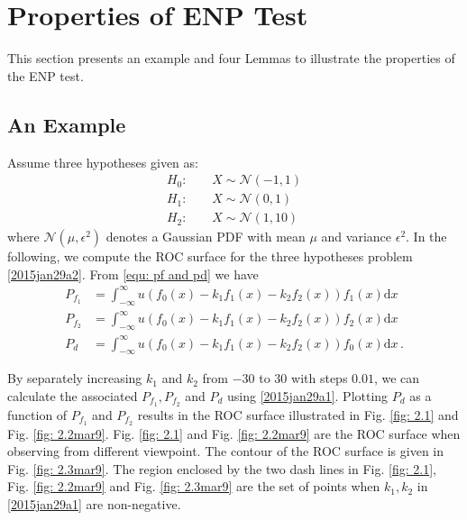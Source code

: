 
\section{Properties of ENP Test}
This section presents an example and four Lemmas to illustrate the properties of the ENP test. 
\subsection{An Example}
Assume three hypotheses given as:
\begin{equation}
  \label{2015jan29a2}
\begin{split}
H_0:\;\;\;\;&X \sim \mathcal{N}(-1, 1)\\
H_1:\;\;\;\;&X \sim \mathcal{N}(0, 1)\\
H_2:\;\;\;\;&X \sim \mathcal{N}(1, 10)
\end{split}
\end{equation}
where $\mathcal{N}(\mu, \epsilon^2)$ denotes a Gaussian PDF with mean $\mu$ and variance $\epsilon^2$. In the following, we compute the ROC surface for the three hypotheses problem \eqref{2015jan29a2}.  
From \eqref{equ: pf and pd} we have  
\begin{equation}
  \begin{split}
	P_{f_1} &= \int_{-\infty}^{\infty}u(f_0(x) - k_1f_1(x) -k_2f_2(x))f_1(x)\mathrm{d}x\\
	P_{f_2} &= \int_{-\infty}^{\infty}u(f_0(x) - k_1f_1(x) -k_2f_2(x))f_2(x)\mathrm{d}x\\
	P_d     &= \int_{-\infty}^{\infty}u(f_0(x) - k_1f_1(x) -k_2f_2(x))f_0(x)\mathrm{d}x\,.
  \end{split}
  \label{2015jan29a1}
\end{equation}

By separately increasing $k_1$ and $k_2$ from $-30$ to $30$ with steps $0.01$, we can calculate the associated $P_{f_1}, P_{f_2}$ and $P_d$ using \eqref{2015jan29a1}. 
Plotting $P_d$ as a function of $P_{f_1}$ and $P_{f_2}$ results in the ROC surface illustrated in Fig. \ref{fig: 2.1} and Fig. \ref{fig: 2.2mar9}. Fig. \ref{fig: 2.1} and Fig. \ref{fig: 2.2mar9} are the ROC surface when observing from different viewpoint. The contour of the ROC surface is given in Fig. \ref{fig: 2.3mar9}. The region enclosed by the two dash lines in Fig. \ref{fig: 2.1}, Fig. \ref{fig: 2.2mar9} and Fig. \ref{fig: 2.3mar9} are the set of points when $k_1, k_2$ in \eqref{2015jan29a1} are non-negative.  

